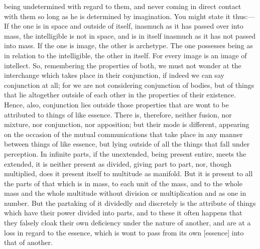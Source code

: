 \documentclass[12pt]{article}
\begin{document}
being undetermined with regard to them, and never coming in direct contact with
them so long as he is determined by imagination. You might state it thus:---If
the one is in space and outside of itself, inasmuch as it has passed over into
mass, the intelligible is not in space, and is in itself inasmuch as it has not
passed into mass. If the one is image, the other is archetype. The one
possesses being as in relation to the intelligible, the other in itself. For
every image is an image of intellect. So, remembering the properties of both,
we must not wonder at the interchange which takes place in their conjunction,
if indeed we can say conjunction at all; for we are not considering conjunction
of bodies, but of things that lie altogether outside of each other in the
properties of their existence. Hence, also, conjunction lies outside those
properties that are wont to be attributed to things of like es\-sence. There
is, therefore, neither fusion, nor mixture, nor conjunction, nor apposition;
but their mode is different, appearing on the occasion of the mutual
communications that take place in any manner between things of like es\-sence,
but lying outside of all the things that fall under perception. In infinite
parts, if the unextended, being present entire, meets the extended, it is
neither present as divided, giving part to part, nor, though multiplied, does
it present itself to multitude as manifold. But it is present to all the parts
of that which is in mass, to each unit of the mass, and to the whole mass and
the whole multitude without division or multiplication and as one in number.
But the partaking of it dividedly and discretely is the attribute of things
which have their power divided into parts, and to these it often happens that
they falsely cloak their own deficiency under the nature of another, and are at
a loss in regard to the es\-sence, which is wont to pass from its own [es\-sence]
into that of another.
\end{document}
